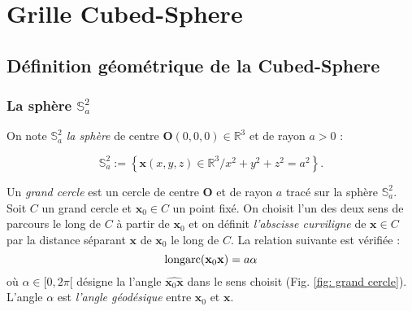 \chapter{Grille Cubed-Sphere}
\label{chap:3}

\section{Définition géométrique de la Cubed-Sphere}

\subsection{La sphère $\mathbb{S}_a^2$}

On note $\mathbb{S}_a^2$ \textit{la sphère} de centre $\mathbf{O} (0,0,0) \in \mathbb{R}^3$ et de rayon $a>0$ :

\begin{equation}
\mathbb{S}_a^2 := \left\lbrace
\mathbf{x} (x,y,z) \in \mathbb{R}^3 / x^2+y^2+z^2 = a^2
\right\rbrace.
\end{equation} 

Un \textit{grand cercle} est un cercle de centre $\mathbf{O}$ et de rayon $a$ tracé sur la sphère $\mathbb{S}_a^2$.
Soit $C$ un grand cercle et $\mathbf{x}_0 \in C$ un point fixé. On choisit l'un des deux sens de parcours le long de $C$ à partir de $\mathbf{x}_0$ et on définit \textit{l'abscisse curviligne} de $\mathbf{x} \in C$ par la distance séparant $\mathbf{x}$ de $\mathbf{x}_0$ le long de $C$. La relation suivante est vérifiée :
\begin{equation}
\text{longarc}(\mathbf{x}_0  \mathbf{x}) = a \alpha
\end{equation}
où $\alpha \in [ 0, 2 \pi[$ désigne la l'angle $\widehat{\mathbf{x}_0  \mathbf{x}}$ dans le sens choisit (Fig. \ref{fig: grand cercle}). L'angle $\alpha$ est \textit{l'angle géodésique} entre $\mathbf{x}_0$ et $\mathbf{x}$.

